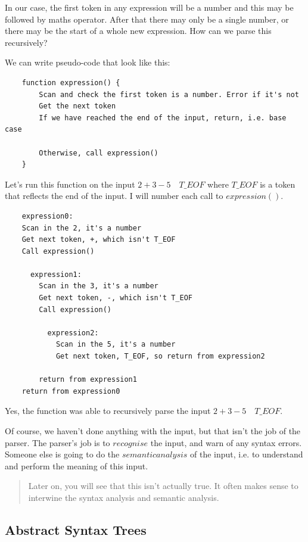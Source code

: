 \documentclass[a4paper,12pt]{article}
\begin{document}
In our case, the first token in any expression will be a number and this may be followed by maths operator. After that there may only be a single number, or there may be the start of a whole new expression. How can we parse this recursively?

We can write pseudo-code that look like this:

\begin{lstlisting}
    function expression() {
        Scan and check the first token is a number. Error if it's not
        Get the next token
        If we have reached the end of the input, return, i.e. base case

        Otherwise, call expression()
    }
\end{lstlisting}

Let's run this function on the input $2 + 3 - 5\quad T\_EOF$ where $T\_EOF$ is a token that reflects the end of the input. I will number each call to $expression()$.

\begin{lstlisting}
    expression0:
    Scan in the 2, it's a number
    Get next token, +, which isn't T_EOF
    Call expression()

      expression1:
        Scan in the 3, it's a number
        Get next token, -, which isn't T_EOF
        Call expression()

          expression2:
            Scan in the 5, it's a number
            Get next token, T_EOF, so return from expression2

        return from expression1
    return from expression0
\end{lstlisting}

Yes, the function was able to recursively parse the input $2 + 3 - 5\quad T\_EOF$.

Of course, we haven't done anything with the input, but that isn't the job of the parser. The parser's job is to $recognise$ the input, and warn of any syntax errors. Someone else is going to do the $semantic analysis$ of the input, i.e. to understand and perform the meaning of this input.

\begin{quote}
Later on, you will see that this isn't actually true. It often makes sense to interwine the syntax analysis and semantic analysis.
\end{quote}

\subsection{Abstract Syntax Trees}
\end{document}
